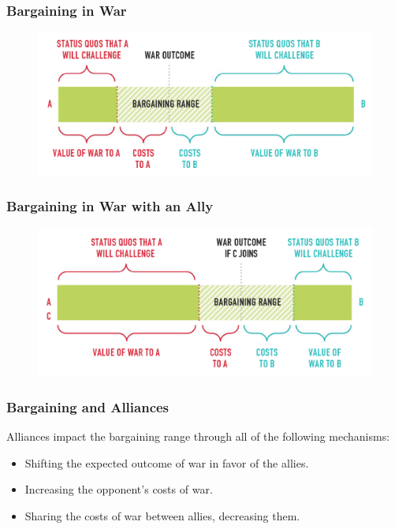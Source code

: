 \documentclass[handout]{beamer}
\begin{document}
\begin{frame} 
	\frametitle{\LARGE{Bargaining in War}}
	\begin{figure}[ht!]
		\centering
		\includegraphics[width=\textwidth,height=0.8\textheight,keepaspectratio]{./nonally_bargain.png}
	\end{figure}
\end{frame}

\begin{frame} 
	\frametitle{\LARGE{Bargaining in War with an Ally}}
	\begin{figure}[ht!]
		\centering
		\includegraphics[width=\textwidth,height=0.8\textheight,keepaspectratio]{./ally_bargain.png}
	\end{figure}
\end{frame}

\begin{frame} 
\frametitle{\LARGE{Bargaining and Alliances}}
Alliances impact the bargaining range through all of the following mechanisms:
	\begin{itemize}
		\item Shifting the expected outcome of war in favor of the allies. \pause 
		\item Increasing the opponent's costs of war. \pause
		\item Sharing the costs of war between allies, decreasing them.
	\end{itemize}
\end{frame}
\end{document}
